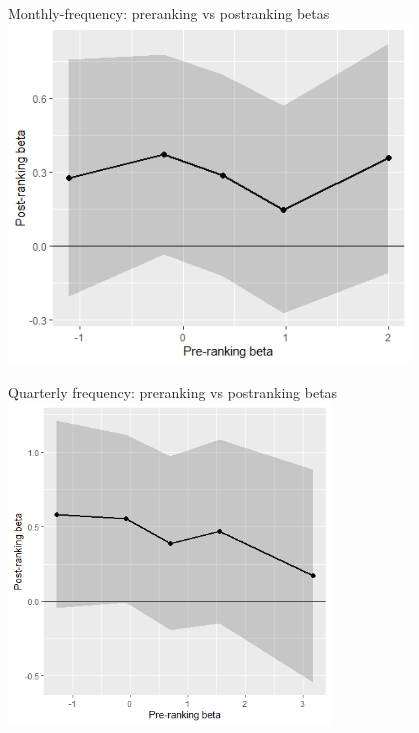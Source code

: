 \documentclass{beamer}
\begin{document}
\begin{frame}{Monthly-frequency: preranking vs postranking betas}
\includegraphics[width=0.8\textwidth]{betas_nov_0.png}
\end{frame}

\begin{frame}{Quarterly frequency: preranking vs postranking betas}
\includegraphics[width=0.64\textwidth]{paper_nov20/betas_qtr.png}
\end{frame}
\end{document}
